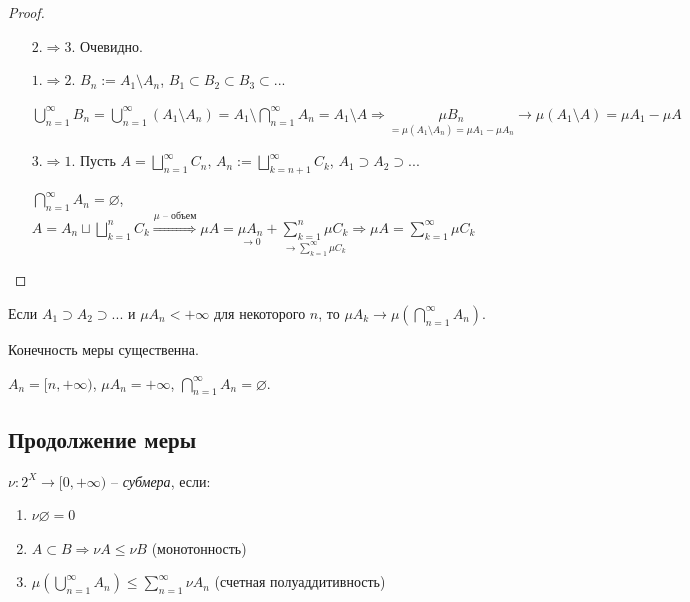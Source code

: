 \begin{proof}~
    \begin{enumerate}
        \item[$2. \Rightarrow 3.$] Очевидно.
        \item[$1. \Rightarrow 2.$] $B_n := A_1 \setminus A_n$,   $B_1 \subset B_2 \subset B_3 \subset ...$
        
        $\bigcup\limits_{n=1}^\infty B_n = \bigcup\limits_{n=1}^\infty (A_1 \setminus A_n) = A_1 \setminus \bigcap\limits_{n=1}^\infty A_n = A_1 \setminus A\Rightarrow
        \underset{=\mu(A_1\setminus A_n)=\mu A_1 - \mu A_n}{\mu B_n} \rightarrow \mu (A_1\setminus A) = \mu A_1-\mu A$

        \item[$3. \Rightarrow 1.$] Пусть $A=\bigsqcup\limits_{n=1}^\infty C_n$, $A_n:=\bigsqcup\limits_{k=n+1}^\infty C_k$, $A_1 \supset A_2 \supset ...$ 
        
        $\bigcap\limits_{n=1}^\infty A_n =\varnothing$, $A=A_n \sqcup \bigsqcup\limits_{k=1}^n C_k\overset{\mu\text{ – объем}}{\Rightarrow}
        \mu A = \underset{\rightarrow 0}{\mu A_n}+\underset{\rightarrow\sum\limits_{k=1}^\infty \mu C_k}{\sum\limits_{k=1}^n \mu C_k}\Rightarrow
        \mu A = \sum\limits_{k=1}^\infty \mu C_k$
    \end{enumerate}
\end{proof}

\begin{corollary}
    Если $A_1 \supset A_2 \supset ...$ и $\mu A_n < +\infty$ для некоторого
    $n$, то $\mu A_k \rightarrow \mu (\bigcap\limits_{n=1}^\infty A_n)$.
\end{corollary}

\begin{remark}
    Конечность меры существенна.

    $A_n = [n, +\infty)$, $\mu A_n = +\infty$, $\bigcap\limits_{n=1}^\infty A_n =\varnothing$.
\end{remark}

\subsection{Продолжение меры}

\begin{definition}
    $\nu: 2^X \rightarrow [0, +\infty)$ – \textit{субмера}, если:
    \begin{enumerate}
        \item $\nu \varnothing =0$
        \item $A\subset B\Rightarrow \nu A\leq \nu B$ (монотонность)
        \item $\mu(\bigcup\limits_{n=1}^\infty A_n)\leq \sum\limits_{n=1}^\infty \nu A_n$ (счетная полуаддитивность)
    \end{enumerate}
\end{definition}

